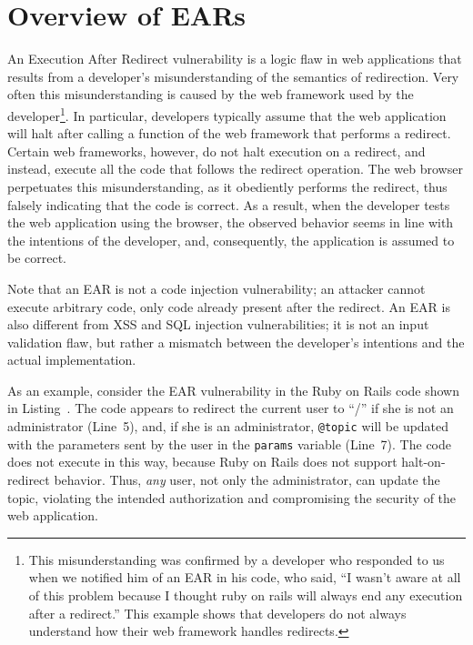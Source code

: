 \section{Overview of EARs}

An Execution After Redirect vulnerability is a logic flaw in web
applications that results from a developer's misunderstanding of the
semantics of redirection. Very often this misunderstanding is caused by the
web framework used by the developer\footnote{ This misunderstanding was
  confirmed by a developer who responded to us when we notified him of an
  EAR in his code, who said, ``I wasn't aware at all of this problem
  because I thought ruby on rails will always end any execution after a
  redirect.'' This example shows that developers do not always understand
  how their web framework handles redirects.}. In particular, developers
typically assume that the web application will halt after calling a
function of the web framework that performs a redirect. Certain web
frameworks, however, do not halt execution on a redirect, and instead,
execute all the code that follows the redirect operation. The web browser
perpetuates this misunderstanding, as it obediently performs the redirect,
thus falsely indicating that the code is correct. As a result, when the
developer tests the web application using the browser, the observed
behavior seems in line with the intentions of the developer, and,
consequently, the application is assumed to be correct.

Note that an EAR is not a code injection vulnerability; an attacker
cannot execute arbitrary code, only code already present after the
redirect. An EAR is also different from XSS and
SQL injection vulnerabilities; it is not an input validation flaw, but rather a
mismatch between the developer's intentions and the actual
implementation.



As an example, consider the EAR vulnerability in the Ruby on Rails code
shown in Listing~. The code appears to redirect the
current user to ``/'' if she is not an administrator (Line~5), and, if she
is an administrator, \texttt{@topic} will be updated with the parameters
sent by the user in the \texttt{params} variable (Line~7). The code does
not execute in this way, because Ruby on Rails does not support
halt-on-redirect behavior. Thus, \emph{any} user, not only the
administrator, can update the topic, violating the intended authorization
and compromising the security of the web application.

